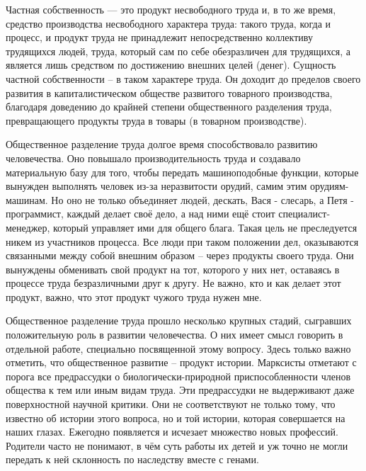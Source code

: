 \documentclass[12pt,a4paper,openany]{book}
\begin{document}
Частная собственность — это продукт несвободного труда и, в то же время, средство производства несвободного характера труда: такого труда, когда и процесс, и продукт труда не принадлежит непосредственно коллективу трудящихся людей, труда, который сам по себе обезразличен для трудящихся, а является лишь средством по достижению внешних целей (денег). Сущность частной собственности – в таком характере труда. Он доходит до пределов своего развития в капиталистическом обществе развитого товарного производства, благодаря доведению до крайней степени общественного разделения труда, превращающего продукты труда в товары (в товарном производстве).

Общественное разделение труда долгое время способствовало развитию человечества. Оно повышало производительность труда и создавало материальную базу для того, чтобы передать машиноподобные функции, которые вынужден выполнять человек из-за неразвитости орудий, самим этим орудиям-машинам. Но оно не только объединяет людей, дескать, Вася - слесарь, а Петя - программист, каждый делает своё дело, а над ними ещё стоит специалист-менеджер, который управляет ими для общего блага. Такая цель не преследуется никем из участников процесса. Все люди при таком положении дел, оказываются связанными между собой внешним образом – через продукты своего труда. Они вынуждены обменивать свой продукт на тот, которого у них нет, оставаясь в процессе труда безразличными друг к другу. Не важно, кто и как делает этот продукт, важно, что этот продукт чужого труда нужен мне.

Общественное разделение труда прошло несколько крупных стадий, сыгравших положительную роль в развитии человечества. О них имеет смысл говорить в отдельной работе, специально посвященной этому вопросу. Здесь только важно отметить, что общественное развитие – продукт истории. Марксисты отметают с порога все предрассудки о биологически-природной приспособленности членов общества к тем или иным видам труда. Эти предрассудки не выдерживают даже поверхностной научной критики. Они не соответствуют не только тому, что известно об истории этого вопроса, но и той истории, которая совершается на наших глазах. Ежегодно появляется и исчезает множество новых профессий. Родители часто не понимают, в чём суть работы их детей и уж точно не могли передать к ней склонность по наследству вместе с генами.
\end{document}
